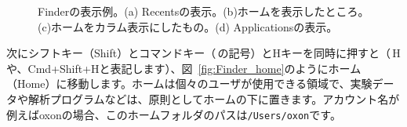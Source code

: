 \begin{figure}
  \centering
  \hfill%
  \hfill%
  \caption{Finderの表示例。(a) Recentsの表示。(b)ホームを表示したところ。(c)ホームをカラム表示にしたもの。(d) Applicationsの表示。}
\label{fig:Finder}
\end{figure}

次にシフトキー（Shift）とコマンドキー（\cmdkey\,の記号）とHキーを同時に押すと（\shiftkey\cmdkey\,Hや、Cmd+Shift+Hと表記します）、図~\ref{fig:Finder_home}のようにホーム（Home）に移動します。ホームは個々のユーザが使用できる領域で、実験データや解析プログラムなどは、原則としてホームの下に置きます。アカウント名が例えばoxonの場合、このホームフォルダのパスは\texttt{/Users/oxon}です。

